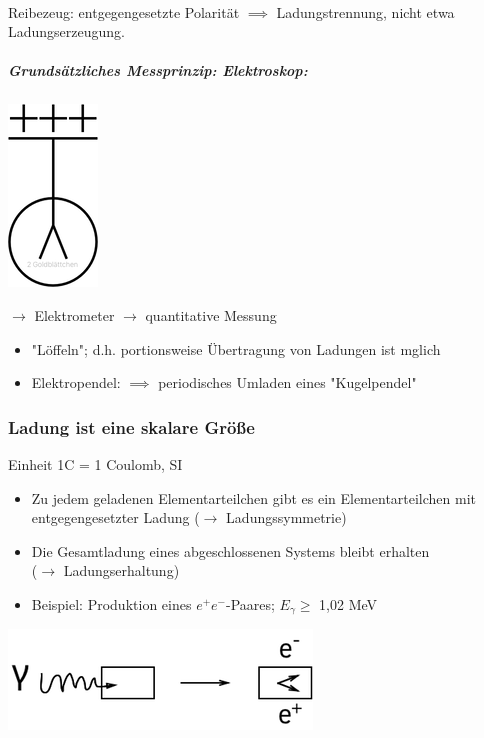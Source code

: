 \documentclass[11pt]{article}
\begin{document}
			\linebreak\\
			Reibezeug: entgegengesetzte Polarit\"{a}t
			$\implies$ Ladungstrennung, nicht etwa Ladungserzeugung.
			\newpage
			\subparagraph {Grunds\"{a}tzliches Messprinzip: Elektroskop:} 
			
			\includegraphics{skizzen/14/14_1B1}
			
			$\rightarrow$ Elektrometer $\rightarrow$ quantitative Messung
			\begin{itemize}
				\item "L\"{o}ffeln"; d.h. portionsweise Übertragung von Ladungen ist mglich
				\item Elektropendel: $\implies$ periodisches Umladen eines "Kugelpendel"
			\end{itemize}
			
			\subsubsection{Ladung ist eine skalare Gr\"{o}\ss{}e } Einheit 1C = 1 Coulomb, SI
				\begin{itemize}
					\item Zu jedem geladenen Elementarteilchen gibt es ein Elementarteilchen mit entgegengesetzter Ladung ($\rightarrow$ Ladungssymmetrie)
					\item Die Gesamtladung eines abgeschlossenen Systems bleibt erhalten \\
					($\rightarrow$ Ladungserhaltung)
					\item Beispiel: Produktion eines $ e^+e^- $-Paares; $ E_\gamma \geq $ 1,02 MeV
				\end{itemize}
				
				\includegraphics{skizzen/14/14_1B2}
				
\end{document}
